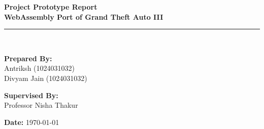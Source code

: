 \documentclass[12pt,a4paper]{article}
\begin{document}
\begin{titlepage}
    \centering
    \vspace*{1.5cm}
    
    {\Huge \textbf{Project Prototype Report}} \\[0.5cm]
    {\Large \textbf{WebAssembly Port of Grand Theft Auto III}} \\
    
    \vspace{1.5cm}
    \rule{\linewidth}{1pt} \\
    \vspace{1.5cm}
    
    \begin{minipage}{0.48\textwidth}
        \begin{flushleft} \large
            \textbf{Prepared By:}\\
            Antriksh (1024031032)\\
            Divyam Jain (1024031032)
        \end{flushleft}
    \end{minipage}
    \begin{minipage}{0.48\textwidth}
        \begin{flushright} \large
            \textbf{Supervised By:}\\
            Professor Nisha Thakur
        \end{flushright}
    \end{minipage}

    \vfill

    {\large \textbf{Date:} \today}
\end{titlepage}

\begin{abstract}
\noindent This report details the prototype implementation of porting Grand Theft Auto III to the web browser utilizing WebAssembly (WASM), WebGL 2.0, and the Emscripten toolchain based on the open-source reverse-engineered engine codebase (\texttt{re3}). The project aims to eliminate the need for native platform binaries or external installations by executing legacy C++ game engines natively inside modern web browsers. This prototype demonstrates successful compilation of core C++ engine components, basic WebGL graphics context initialization, asynchronous asset fetching over HTTP, and frame-rate synchronization within browser execution contexts.
\end{abstract}

\newpage
\end{document}
